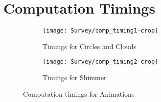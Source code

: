 \documentclass[../initial_thesis.tex]{subfiles}
\begin{document}
\section{Computation Timings} \label{sec:timings}

\begin{figure}
  \begin{subfigure}{0.5\textwidth}
    \centering
    \texttt{[image: Survey/comp\_timing1-crop]}
    \caption{Timings for Circles and Clouds}
    \label{fig:timings_circlesclouds}
  \end{subfigure}
  \begin{subfigure}{0.5\textwidth}
    \centering
    \texttt{[image: Survey/comp\_timing2-crop]}
    \caption{Timings for Shimmer}
    \label{fig:timings_shimmer}
  \end{subfigure}
  \caption{Computation timings for Animations}
  \label{fig:comp_timings}
\end{figure}
\end{document}
